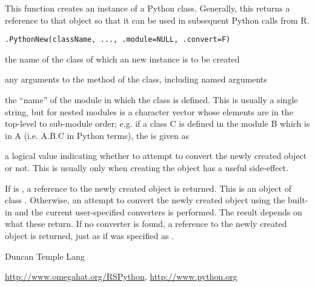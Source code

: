 \begin{Description}\relax
This function creates an instance of a Python class.
Generally, this returns a reference to that object
so that it can be used in subsequent Python calls 
from R.\end{Description}
\begin{Usage}
\begin{verbatim}
.PythonNew(className, ..., .module=NULL, .convert=F)
\end{verbatim}
\end{Usage}
\begin{Arguments}
\begin{ldescription}
\item[\code{className}] the name of the class of which an  new instance is to be created
\item[\code{...}] any arguments to the  method of the class, including
named arguments
\item[\code{.module}] the ``name'' of the module in which the class is defined. This is
usually a single string, but for nested modules is a character vector whose elements
are in the top-level to sub-module order; e.g. if a class C is defined in the module B
which is in A (i.e. A.B.C in Python terms), the  is given as
\item[\code{.convert}] a logical value indicating whether to attempt to convert the newly created object
or not. This is usually only  when creating the object has a useful side-effect.
\end{ldescription}
\end{Arguments}
\begin{Value}
If  is , a reference to the 
newly created object is returned. This is an object of
class \code{}. Otherwise, an attempt to convert the newly created
object using the built-in and the current user-specified converters
is performed. The result depends on what these return. If no converter
is found, a reference to the newly created object is  returned, just
as if  was specified as .\end{Value}
\begin{Author}\relax
Duncan Temple Lang\end{Author}
\begin{References}\relax
\url{http://www.omegahat.org/RSPython},
\url{http://www.python.org}\end{References}
\begin{SeeAlso}\relax
{}
\end{SeeAlso}
\begin{Examples}
\end{Examples}

